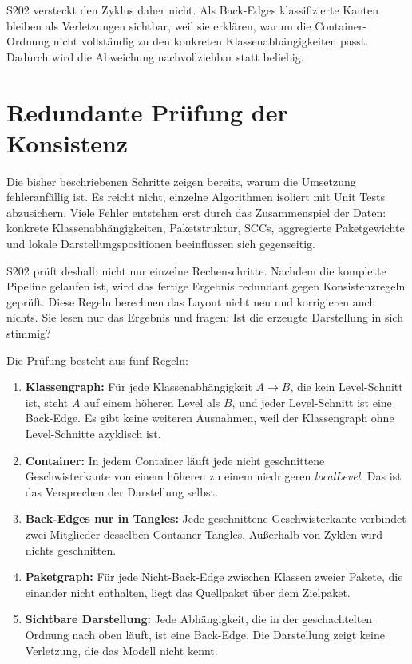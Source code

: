 \documentclass[a4paper,11pt]{article}
\begin{document}
S202 versteckt den Zyklus daher nicht. Als Back-Edges klassifizierte Kanten
bleiben als Verletzungen sichtbar, weil sie erkl\"aren, warum die
Container-Ordnung nicht vollst\"andig zu den konkreten Klassenabh\"angigkeiten
passt. Dadurch wird die Abweichung nachvollziehbar statt beliebig.

\section{Redundante Pr\"ufung der Konsistenz}

Die bisher beschriebenen Schritte zeigen bereits, warum die Umsetzung
fehleranf\"allig ist. Es reicht nicht, einzelne Algorithmen isoliert mit Unit
Tests abzusichern. Viele Fehler entstehen erst durch das Zusammenspiel der
Daten: konkrete Klassenabh\"angigkeiten, Paketstruktur, SCCs, aggregierte
Paketgewichte und lokale Darstellungspositionen beeinflussen sich gegenseitig.

S202 pr\"uft deshalb nicht nur einzelne Rechenschritte. Nachdem die komplette
Pipeline gelaufen ist, wird das fertige Ergebnis redundant gegen
Konsistenzregeln gepr\"uft. Diese Regeln berechnen das Layout nicht neu und
korrigieren auch nichts. Sie lesen nur das Ergebnis und fragen: Ist die
erzeugte Darstellung in sich stimmig?

Die Pr\"ufung besteht aus f\"unf Regeln:

\begin{enumerate}
  \item \textbf{Klassengraph:} F\"ur jede Klassenabh\"angigkeit $A \to B$, die
        kein Level-Schnitt ist, steht $A$ auf einem h\"oheren Level als $B$,
        und jeder Level-Schnitt ist eine Back-Edge. Es gibt keine weiteren
        Ausnahmen, weil der Klassengraph ohne Level-Schnitte azyklisch ist.
  \item \textbf{Container:} In jedem Container l\"auft jede nicht geschnittene
        Geschwisterkante von einem h\"oheren zu einem niedrigeren
        \emph{localLevel}. Das ist das Versprechen der Darstellung selbst.
  \item \textbf{Back-Edges nur in Tangles:} Jede geschnittene Geschwisterkante
        verbindet zwei Mitglieder desselben Container-Tangles. Au\ss{}erhalb von
        Zyklen wird nichts geschnitten.
  \item \textbf{Paketgraph:} F\"ur jede Nicht-Back-Edge zwischen Klassen zweier
        Pakete, die einander nicht enthalten, liegt das Quellpaket \"uber dem
        Zielpaket.
  \item \textbf{Sichtbare Darstellung:} Jede Abh\"angigkeit, die in der
        geschachtelten Ordnung nach oben l\"auft, ist eine Back-Edge. Die
        Darstellung zeigt keine Verletzung, die das Modell nicht kennt.
\end{enumerate}
\end{document}
